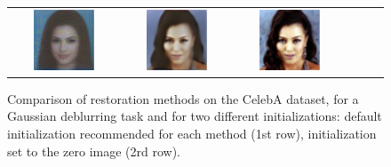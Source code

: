 \documentclass{article} %
\theoremstyle{definition}
\begin{document}
\begin{figure}[htp]
\begin{adjustbox}{max width=1.0\textwidth}
\begin{tabular}{cccccc}
\includegraphics[width=0.6\textwidth]{figures/celeba/black_init/gaussian_deblurring_FFT_d_flow_batch11_im0_pnsr12.73.pdf} & 
\includegraphics[width=0.6\textwidth]{figures/celeba/black_init/gaussian_deblurring_FFT_flow_priors_batch11_im0_pnsr18.94.pdf} & 
\includegraphics[width=0.6\textwidth]{figures/celeba/black_init/gaussian_deblurring_FFT_pnp_flow_batch11_im0_pnsr33.76.pdf}
    \end{tabular}
    \end{adjustbox}
    \caption{Comparison of restoration methods on the CelebA dataset, for a Gaussian deblurring task and for two different initializations: default initialization recommended for each method (1st row), initialization set to the zero image (2rd row). \label{fig:sensitivity_init}}
\end{figure}
\end{document}
